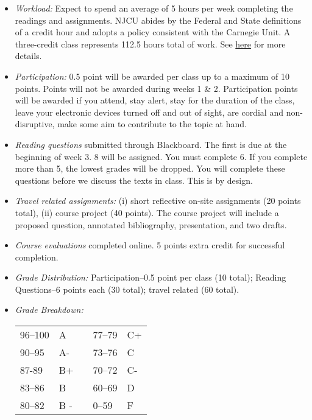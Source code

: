 \documentclass[article,oneside]{memoir}
\begin{document}
\begin{itemize}
\item \textit{Workload:} Expect to spend an average of 5 hours per week completing the readings and assignments. NJCU abides by the Federal and State definitions of a credit hour and adopts a policy consistent with the Carnegie Unit. A three-credit class represents 112.5 hours total of work. See \href{http://scottoconnor.org/resources/Credit.pdf}{here} for more details.

\item \textit{Participation:} 0.5 point will be awarded per class up to a maximum of 10 points. Points will not be awarded during weeks 1 \& 2. Participation points will be awarded if you attend, stay alert, stay for the duration of the class, leave your electronic devices turned off and out of sight, are cordial and non-disruptive, make some aim to contribute to the topic at hand. 


\item \textit{Reading questions} submitted through Blackboard. The first is due at the beginning of week 3. 8 will be assigned. You must complete 6. If you complete more than 5, the lowest grades will be dropped. You will complete these questions before we discuss the texts in class. This is by design. 

\item \textit{Travel related assignments:} (i) short reflective on-site assignments (20 points total), (ii) course project (40 points). The course project will include a proposed question, annotated bibliography, presentation, and two drafts. 

\item \textit{Course evaluations} completed online. 5 points extra credit for successful completion.





\item \textit{Grade Distribution:} Participation--0.5 point per class (10 total); Reading Questions--6 points each (30 total); travel related  (60 total).

\item \textit{Grade Breakdown:}

 \begin{tabular}{ | l | l | p{2cm} | l | l | }
    \hline 
96--100 & A  & &  77--79 &  C+ \\  
90--95 & A- & &  73--76 & C \\
87-89 & B+ &  &  70--72 & C- \\ 
83--86 & B  & &  60--69 & D\\
80--82 & B - & & 0--59 & F\\ \hline
    \end{tabular}


\end{itemize}
\end{document}
